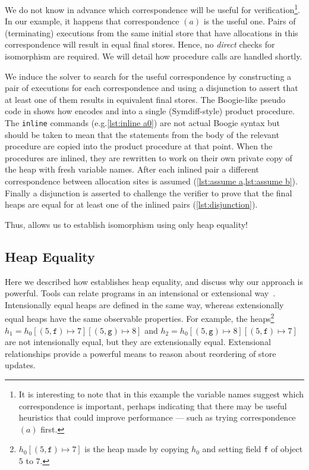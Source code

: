 \documentclass[runningheads,a4paper]{llncs}
\makeatletter
\newcommand*{\eg}{e.g.\@\xspace}
\makeatother
\begin{document}
We do not know in advance which correspondence will be useful for verification\footnote{It is interesting to note that in this example the variable names suggest which correspondence is important, perhaps indicating that there may be useful heuristics that could improve performance --- such as trying correspondence $(a)$ first.}. In our example, it happens that correspondence $(a)$ is the useful one. Pairs of (terminating) executions from the same initial store that have allocations in this correspondence will result in equal final stores. Hence, no \emph{direct} checks for isomorphism are required. We will detail how procedure calls are handled shortly.

We induce the solver to search for the useful correspondence by constructing a pair of executions for each correspondence and using a disjunction to assert that at least one of them results in equivalent final stores. The Boogie-like pseudo code in  shows how \tool{} encodes \copylr{} and \copyrl{} into a single (Symdiff-style) product procedure. The \texttt{inline} commands (\eg \cref{lst:inline a0}) are not actual Boogie syntax but should be taken to mean that the statements from the body of the relevant procedure are copied into the product procedure at that point. When the procedures are inlined, they are rewritten to work on their own private copy of the heap with fresh variable names. After each inlined pair a different correspondence between allocation sites is assumed (\cref{lst:assume a,lst:assume b}). Finally a disjunction is asserted to challenge the verifier to prove that the final heaps are equal for at least one of the inlined pairs (\cref{lst:disjunction}).

Thus, \metho{} allows us to establish isomorphism using only heap equality!

\subsection{Heap Equality}\label{sec:extensionality}

Here we described how \tool{} establishes heap equality, and discuss why our approach is powerful. Tools can relate programs in an intensional or extensional way~\cite{Benton2004}. Intensionally equal heaps are defined in the same way, whereas extensionally equal heaps have the same observable properties. For example, the heaps\footnote{$h_0[(5,\mathtt{f})\mapsto 7]$ is the heap made by copying $h_0$ and setting field \texttt{f} of object $5$ to $7$.}  $h_1=h_0[(5,\mathtt{f}) \mapsto 7][(5,\mathtt{g}) \mapsto 8]$ and $h_2=h_0[(5,\mathtt{g}) \mapsto 8][(5,\mathtt{f}) \mapsto 7]$ are not intensionally equal, but they are extensionally equal. Extensional relationships provide a powerful means to reason about reordering of store updates.
\end{document}
